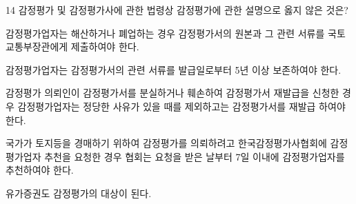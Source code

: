 \begin{question}{14}
감정평가 및 감정평가사에 관한 법령상 감정평가에 관한 설명으로 옳지 않은 것은?
\begin{choices}
  \item 감정평가업자는 해산하거나 폐업하는 경우 감정평가서의 원본과 그 관련 서류를 국토교통부장관에게 제출하여야 한다.
  \item 감정평가업자는 감정평가서의 관련 서류를 발급일로부터 5년 이상 보존하여야 한다.
  \item 감정평가 의뢰인이 감정평가서를 분실하거나 훼손하여 감정평가서 재발급을 신청한 경우 감정평가업자는 정당한 사유가 있을 때를 제외하고는 감정평가서를 재발급 하여야 한다.
  \item 국가가 토지등을 경매하기 위하여 감정평가를 의뢰하려고 한국감정평가사협회에 감정평가업자 추천을 요청한 경우 협회는 요청을 받은 날부터 7일 이내에 감정평가업자를 추천하여야 한다.
  \item 유가증권도 감정평가의 대상이 된다.
\end{choices}
\end{question}
